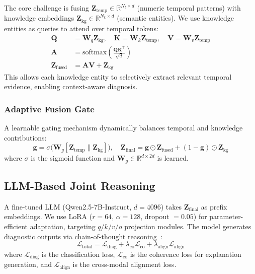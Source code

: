\documentclass[11pt,a4paper]{article}
\begin{document}
The core challenge is fusing $\mathbf{Z}_{\text{temp}} \in \mathbb{R}^{N_t \times d}$ (numeric temporal patterns) with knowledge embeddings $\mathbf{Z}_{\text{kg}} \in \mathbb{R}^{N_k \times d}$ (semantic entities). We use knowledge entities as queries to attend over temporal tokens:
\begin{align}
\mathbf{Q} &= \mathbf{W}_q \mathbf{Z}_{\text{kg}}, \quad \mathbf{K} = \mathbf{W}_k \mathbf{Z}_{\text{temp}}, \quad \mathbf{V} = \mathbf{W}_v \mathbf{Z}_{\text{temp}} \label{eq:qkv}\\
\mathbf{A} &= \text{softmax}\left(\frac{\mathbf{Q}\mathbf{K}^\top}{\sqrt{d}}\right) \label{eq:attn}\\
\mathbf{Z}_{\text{fused}} &= \mathbf{A}\mathbf{V} + \mathbf{Z}_{\text{kg}} \label{eq:fused}
\end{align}
This allows each knowledge entity to selectively extract relevant temporal evidence, enabling context-aware diagnosis.

\subsubsection{Adaptive Fusion Gate}\label{sec:method:gate}

A learnable gating mechanism dynamically balances temporal and knowledge contributions:
\begin{equation}\label{eq:gate}
\mathbf{g} = \sigma\bigl(\mathbf{W}_g [\mathbf{Z}_{\text{temp}} \| \mathbf{Z}_{\text{kg}}]\bigr), \quad \mathbf{Z}_{\text{final}} = \mathbf{g} \odot \mathbf{Z}_{\text{fused}} + (1 - \mathbf{g}) \odot \mathbf{Z}_{\text{kg}}
\end{equation}
where $\sigma$ is the sigmoid function and $\mathbf{W}_g \in \mathbb{R}^{d \times 2d}$ is learned.

\subsection{LLM-Based Joint Reasoning}\label{sec:method:llm}

A fine-tuned LLM (Qwen2.5-7B-Instruct, $d = 4096$) takes $\mathbf{Z}_{\text{final}}$ as prefix embeddings. We use LoRA ($r = 64$, $\alpha = 128$, dropout $= 0.05$) for parameter-efficient adaptation, targeting $q/k/v/o$ projection modules. The model generates diagnostic outputs via chain-of-thought reasoning~\cite{wei2022cot}:
\begin{equation}\label{eq:loss}
\mathcal{L}_{\text{total}} = \mathcal{L}_{\text{diag}} + \lambda_{\text{co}} \mathcal{L}_{\text{co}} + \lambda_{\text{align}} \mathcal{L}_{\text{align}}
\end{equation}
where $\mathcal{L}_{\text{diag}}$ is the classification loss, $\mathcal{L}_{\text{co}}$ is the coherence loss for explanation generation, and $\mathcal{L}_{\text{align}}$ is the cross-modal alignment loss.
\end{document}
